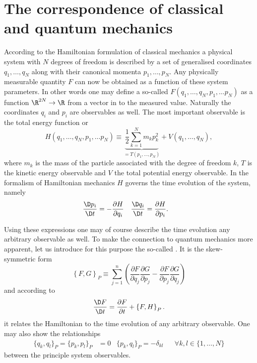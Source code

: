 \section{The correspondence of classical and quantum mechanics}
According to the Hamiltonian formulation of classical mechanics
a physical system with $N$ degrees of freedom
is described by a set of generalised coordinates
$q_1, \ldots, q_N$ along with their canonical momenta $p_1, \ldots, p_N$.
Any physically measurable quantity $F$
can now be obtained as a function of these system parameters.
In other words one may define a so-called 
\newcommand{\clphase}{(q_1, \ldots, q_N, p_1, \ldots p_N)}
$F\clphase$ as a function $\R^{2N} \to \R$
from a vector in  to the measured value.
Naturally the coordinates $q_i$ and $p_i$ are observables as well.
The most important observable is the total energy function or 
\begin{equation}
	H\clphase
	\equiv \underbrace{\frac{1}{2} \sum_{k=1}^N m_k p_k^2}_{= T(p_1, \ldots, p_N)}
	+ V(q_1, \ldots, q_N),
	\label{eqn:HamiltonianClassical}
\end{equation}
where $m_k$ is the mass of the particle associated with
the degree of freedom $k$,
$T$ is the kinetic energy observable and $V$ the total potential energy observable.
In the formalism of Hamiltonian mechanics $H$ governs the time evolution
of the system, namely
\begin{align}
	\frac{\D p_i}{\D t} &= - \frac{\partial H}{\partial q_i} &
	\frac{\D q_i}{\D t} &= \frac{\partial H}{\partial p_i}.
	\label{eqn:HamiltonianEqnMotion}
\end{align}

Using these expressions one may of course describe the time evolution
any arbitrary observable as well.
To make the connection to quantum mechanics more apparent,
let us introduce for this purpose the so-called .
It is the skew-symmetric form
\begin{equation}
	\left\{ F, G \right\}_P \equiv \sum_{j=1}^n \left(
	\frac{\partial  F}{\partial q_j} \frac{\partial G}{\partial p_j}
	- \frac{\partial  F}{\partial p_j} \frac{\partial G}{\partial q_j}
	\right)
	\label{eqn:PoissonBracket}
\end{equation}
and according to
\begin{equation}
	\frac{\D F}{\D t} = \frac{\partial F}{\partial t} + \left\{ F, H \right\}_P.
	\label{eqn:PoissonTimeEvolution}
\end{equation}
it relates the Hamiltonian to the time evolution of any arbitrary observable.
One may also show the relationships
\begin{align}
	\{ q_k, q_l \}_P = \{p_k, p_l\}_P &= 0 & \{ p_k, q_l\}_P = - \delta_{kl} &&\forall k,l \in \{1, \ldots, N\}
	\label{eqn:PoissonProperties}
\end{align}
between the principle system observables.

